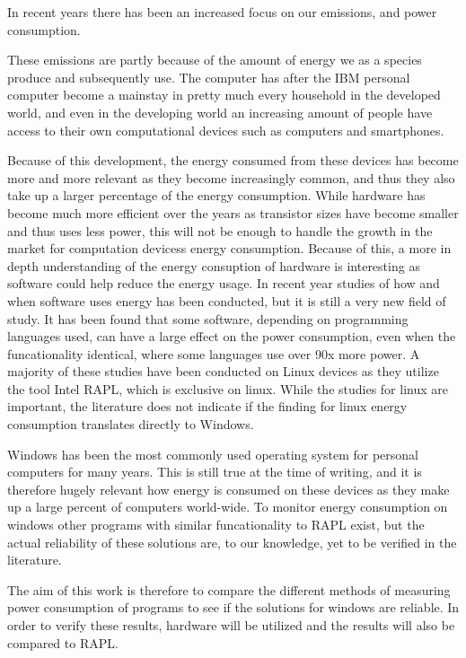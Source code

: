 In recent years there has been an increased focus on our emissions, and power consumption.

These emissions are partly because of the amount of energy we as a species produce and subsequently use. 
The computer has after the IBM personal computer become a mainstay in pretty much every household in the developed world, and even in the developing world an increasing amount of people have access to their own computational devices such as computers and smartphones. 

Because of this development, the energy consumed from these devices has become more and more relevant as they become increasingly common, and thus they also take up a larger percentage of the energy consumption. 
While hardware has become much more efficient over the years as transistor sizes have become smaller and thus uses less power, this will not be enough to handle the growth in the market for computation devicess energy consumption. Because of this, a more in depth understanding of the energy consuption of hardware is interesting as software could help reduce the energy usage. 
In recent year studies of how and when software uses energy has been conducted, but it is still a very new field of study. It has been found that some software, depending on programming languages used, can have a large effect on the power consumption, even when the funcationality identical, where some languages use over 90x more power.
A majority of these studies have been conducted on Linux devices as they utilize the tool Intel RAPL, which is exclusive on linux. While the studies for linux are important, the literature does not indicate if the finding for linux energy consumption translates directly to Windows. 

Windows has been the most commonly used operating system for personal computers for many years. This is still true at the time of writing, and it is therefore hugely relevant how energy is consumed on these devices as they make up a large percent of computers world-wide. To monitor energy consumption on windows other programs with similar funcationality to RAPL exist, but the actual reliability of these solutions are, to our knowledge, yet to be verified in the literature.

The aim of this work is therefore to compare the different methods of measuring power consumption of programs to see if the solutions for windows are reliable. In order to verify these results, hardware will be utilized and the results will also be compared to RAPL.

